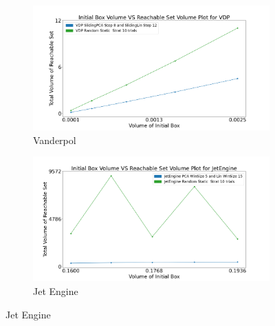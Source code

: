 \begin{figure}[h!]
    \hspace{-1.5em}
    \begin{subfigure}{0.5\textwidth}
    \centering
    \includegraphics[width=1.1\textwidth, height=0.75\textwidth]{figures/InitVolVSReachVol/VDPInitReachVolRanStrat.png}
    \caption{Vanderpol}
    \end{subfigure}%
    \begin{subfigure}{0.5\textwidth}
    \centering
    \includegraphics[width=1.1\textwidth, height=0.75\textwidth]{figures/InitVolVSReachVol/JetEngineInitReachVolRanStrat.png}
    \caption{Jet Engine}
    \end{subfigure}


\end{figure}
